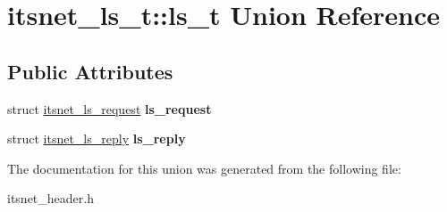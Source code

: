 \hypertarget{unionitsnet__ls__t_1_1ls__t}{\section{itsnet\-\_\-ls\-\_\-t\-:\-:ls\-\_\-t \-Union \-Reference}
\label{unionitsnet__ls__t_1_1ls__t}
}
\subsection*{\-Public \-Attributes}
\begin{DoxyCompactItemize}
\item 
\hypertarget{unionitsnet__ls__t_1_1ls__t_af672bc68d0cb1531567dec8fd7623f7e}{struct \hyperlink{structitsnet__ls__request}{itsnet\-\_\-ls\-\_\-request} {\bfseries ls\-\_\-request}}\label{unionitsnet__ls__t_1_1ls__t_af672bc68d0cb1531567dec8fd7623f7e}

\item 
\hypertarget{unionitsnet__ls__t_1_1ls__t_ab9926daf9210025c6bacacc772128ac6}{struct \hyperlink{structitsnet__ls__reply}{itsnet\-\_\-ls\-\_\-reply} {\bfseries ls\-\_\-reply}}\label{unionitsnet__ls__t_1_1ls__t_ab9926daf9210025c6bacacc772128ac6}

\end{DoxyCompactItemize}


\-The documentation for this union was generated from the following file\-:\begin{DoxyCompactItemize}
\item 
itsnet\-\_\-header.\-h\end{DoxyCompactItemize}
